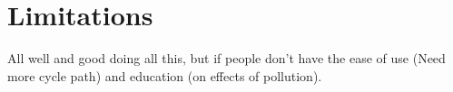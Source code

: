 \documentclass[11pt,twosided,a4paper]{report}
\begin{document}
%




%
%




\chapter{Limitations} \label{chap:limitations}

All well and good doing all this, but if people don't have the ease of use (Need more cycle path) and education (on effects of pollution).
\end{document}
